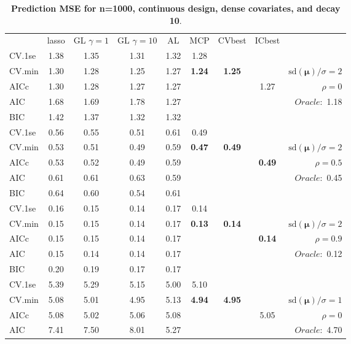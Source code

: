 \clearpage
\begin{table}\vspace{-.5cm}
\caption[l]{ { \bf Prediction MSE for n=1000, continuous design, 
dense covariates, and  decay  10}.}
\vspace{-.5cm}
\footnotesize{}
\begin{center}
\begin{tabular}{l*{7}{c}|r}
 & lasso & GL $\gamma=1$ & GL $\gamma=10$ & AL & MCP  & CVbest & ICbest  \\
\cline{1-9}
CV.1se & 1.38 & 1.35 & 1.31 & 1.32 & 1.28 & & & \\
CV.min & 1.30 & 1.28 & 1.25 & 1.27 & {\bf 1.24} & {\bf 1.25} & & $\mathrm{sd}(\mathbf{\mu})/\sigma=2$ \\
AICc & 1.30 & 1.28 & 1.27 & 1.27 & & & 1.27 &  $\rho=0$ \\
AIC & 1.68 & 1.69 & 1.78 & 1.27 & & & &  \multirow{2}{*}{$Oracle: $ 1.18} \\
BIC & 1.42 & 1.37 & 1.32 & 1.32 & & & &  \\
 \hline 
CV.1se & 0.56 & 0.55 & 0.51 & 0.61 & 0.49 & & & \\
CV.min & 0.53 & 0.51 & 0.49 & 0.59 & {\bf 0.47} & {\bf 0.49} & & $\mathrm{sd}(\mathbf{\mu})/\sigma=2$ \\
AICc & 0.53 & 0.52 & 0.49 & 0.59 & & & {\bf 0.49} &  $\rho=0.5$ \\
AIC & 0.61 & 0.61 & 0.63 & 0.59 & & & &  \multirow{2}{*}{$Oracle: $ 0.45} \\
BIC & 0.64 & 0.60 & 0.54 & 0.61 & & & &  \\
 \hline 
CV.1se & 0.16 & 0.15 & 0.14 & 0.17 & 0.14 & & & \\
CV.min & 0.15 & 0.15 & 0.14 & 0.17 & {\bf 0.13} & {\bf 0.14} & & $\mathrm{sd}(\mathbf{\mu})/\sigma=2$ \\
AICc & 0.15 & 0.15 & 0.14 & 0.17 & & & {\bf 0.14} &  $\rho=0.9$ \\
AIC & 0.15 & 0.14 & 0.14 & 0.17 & & & &  \multirow{2}{*}{$Oracle: $ 0.12} \\
BIC & 0.20 & 0.19 & 0.17 & 0.17 & & & &  \\
 \hline 
CV.1se & 5.39 & 5.29 & 5.15 & 5.00 & 5.10 & & & \\
CV.min & 5.08 & 5.01 & 4.95 & 5.13 & {\bf 4.94} & {\bf 4.95} & & $\mathrm{sd}(\mathbf{\mu})/\sigma=1$ \\
AICc & 5.08 & 5.02 & 5.06 & 5.08 & & & 5.05 &  $\rho=0$ \\
AIC & 7.41 & 7.50 & 8.01 & 5.27 & & & &  \multirow{2}{*}{$Oracle: $ 4.70} \\

\end{tabular}
\end{center}
\end{table}
